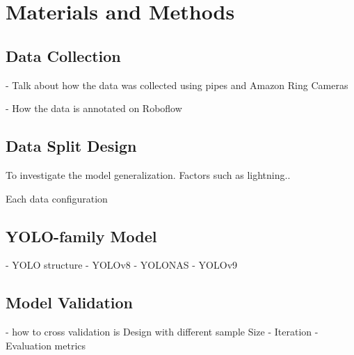 \section{Materials and Methods}
\lipsum[2]
\lipsum[3]

\subsection{Data Collection}
- Talk about how the data was collected using pipes and Amazon Ring Cameras

- How the data is annotated on Roboflow

\subsection{Data Split Design}
To investigate the model generalization. Factors such as lightning..

Each data configuration

\subsection{YOLO-family Model}

- YOLO structure
- YOLOv8
- YOLONAS
- YOLOv9

\subsection{Model Validation}
- how to cross validation is Design with different sample Size
- Iteration
- Evaluation metrics

